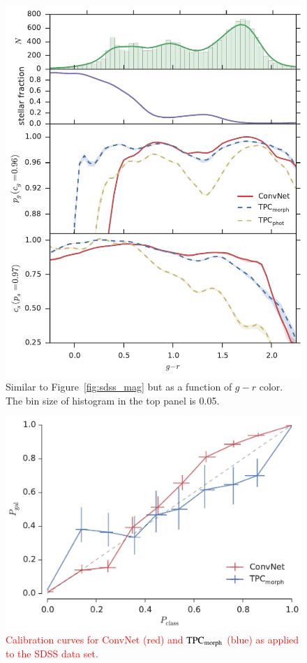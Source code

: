 \documentclass[fleqn,usenatbib]{mnras}
\newcommand{\changed}[1]{\textcolor{red}{#1}}
\begin{document}
\begin{figure}
  \centering
  \includegraphics[width=\columnwidth]{figures/sdss_g_r.pdf}
  \caption{Similar to Figure~\ref{fig:sdss_mag} but as a function of
    $g-r$ color. The bin size of histogram in the top panel is 0.05.}
  \label{fig:sdss_g_r}
\end{figure}

\begin{figure}
  \centering
  \includegraphics[width=\columnwidth]{figures/sdss_calibration.pdf}
  \caption{
    \changed{
    Calibration curves for ConvNet (red) and ${\mathrm{TPC}}_{{\mathrm{morph}}}$
    (blue) as applied to the SDSS data set.
    }
    }
  \label{fig:sdss_calibration}
\end{figure}
\end{document}
